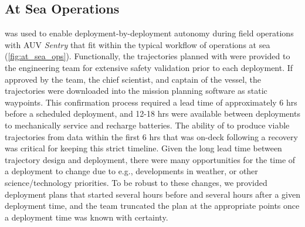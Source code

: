 

\subsection{At Sea Operations}
\PHORTEX was used to enable deployment-by-deployment autonomy during field operations with AUV \emph{Sentry} that fit within the typical workflow of operations at sea (\cref{fig:at_sea_ops}). Functionally, the trajectories planned with \PHORTEX were provided to the \Sentry engineering team for extensive safety validation prior to each deployment. If approved by the \Sentry team, the chief scientist, and captain of the vessel, the trajectories were downloaded into the \Sentry mission planning software as static waypoints. This confirmation process required a lead time of approximately 6 hrs before a scheduled deployment, and 12-18 hrs were available between deployments to mechanically service \Sentry and recharge batteries. The ability of \PHORTEX to produce viable trajectories from data within the first 6 hrs that \Sentry was on-deck following a recovery was critical for keeping this strict timeline. Given the long lead time between trajectory design and \Sentry deployment, there were many opportunities for the time of a deployment to change due to e.g., developments in weather, or other science/technology priorities. To be robust to these changes, we provided deployment plans that started several hours before and several hours after a given deployment time, and the \Sentry team truncated the plan at the appropriate points once a deployment time was known with certainty.


